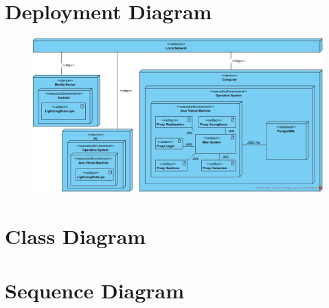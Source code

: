 \section{Deployment Diagram}
\begin{figure}[H]
	\centering
	\includegraphics[width=1\textwidth]{Immagini/deploy.jpg}
\end{figure}
\section{Class Diagram}
\section{Sequence Diagram}